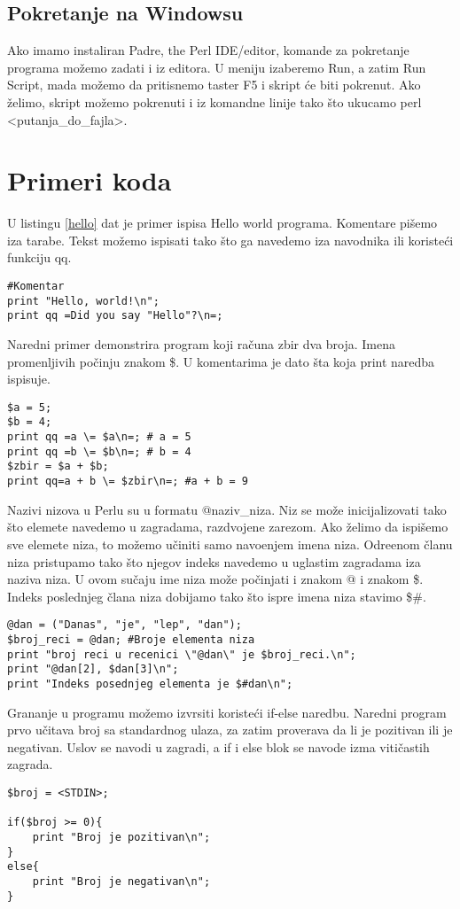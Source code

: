 \documentclass[a4paper]{article}
\begin{document}
\subsection{Pokretanje na Windowsu}
Ako imamo instaliran Padre, the Perl IDE/editor, komande za pokretanje programa mo\v zemo zadati i iz editora. U meniju izaberemo Run, a zatim Run Script, mada mo\v zemo da pritisnemo taster F5 i skript \'ce biti pokrenut.
Ako \v zelimo, skript mo\v zemo pokrenuti i iz komandne linije tako \v sto ukucamo perl <putanja\_do\_fajla>.

\section{Primeri koda}
U listingu \ref{hello} dat je primer ispisa Hello world programa. Komentare pi\v semo iza tarabe. Tekst mo\v zemo ispisati tako \v sto ga navedemo iza navodnika ili koriste\'ci funkciju qq.
\begin{lstlisting}[caption={Primer Hello world programa},frame=single, label=hello]
#Komentar
print "Hello, world!\n";
print qq =Did you say "Hello"?\n=;
\end{lstlisting}

Naredni primer demonstrira program koji ra\v cuna zbir dva broja. Imena promenljivih po\v cinju znakom \$. U komentarima je dato \v sta koja print naredba ispisuje.
\begin{lstlisting}[caption={Zbir dva broja}, frame=single, label = zbir]
$a = 5;
$b = 4;
print qq =a \= $a\n=; # a = 5
print qq =b \= $b\n=; # b = 4
$zbir = $a + $b;
print qq=a + b \= $zbir\n=; #a + b = 9
\end{lstlisting}

Nazivi nizova u Perlu su u formatu @naziv\_niza. Niz se mo\v ze inicijalizovati tako \v sto elemete navedemo u zagradama, razdvojene zarezom. Ako \v zelimo da ispi\v semo sve elemete niza, to mo\v zemo u\v ciniti samo navo\dj{}enjem imena niza. Odre\dj{}enom \v clanu niza pristupamo tako \v sto njegov indeks navedemo u uglastim zagradama iza naziva niza. U ovom su\v caju ime niza mo\v ze po\v cinjati i znakom @ i znakom \$. Indeks poslednjeg \v clana niza dobijamo tako \v sto ispre imena niza stavimo \$\#.
\begin{lstlisting}[caption={Niz}, frame=single, label=niz]
@dan = ("Danas", "je", "lep", "dan"); 
$broj_reci = @dan; #Broje elementa niza
print "broj reci u recenici \"@dan\" je $broj_reci.\n";
print "@dan[2], $dan[3]\n";
print "Indeks posednjeg elementa je $#dan\n";
\end{lstlisting}
Grananje u programu mo\v zemo izvrsiti koriste\'ci if-else naredbu. Naredni program prvo u\v citava broj sa standardnog ulaza, za zatim proverava da li je pozitivan ili je negativan. Uslov se navodi u zagradi, a if i else blok se navode izma\dj{} viti\v castih zagrada.
\begin{lstlisting}[caption={If-else naredba}, frame=single, label=ifelse]
$broj = <STDIN>;

if($broj >= 0){
    print "Broj je pozitivan\n";
}
else{
    print "Broj je negativan\n";
}
\end{lstlisting}
\end{document}
